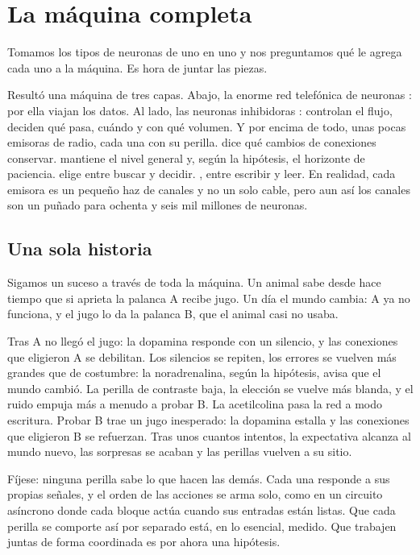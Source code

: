 \chapter{La máquina completa}


Tomamos los tipos de neuronas de uno en uno y nos preguntamos qué le agrega cada uno a la máquina. Es hora de juntar las piezas.

Resultó una máquina de tres capas. Abajo, la enorme red telefónica de neuronas : por ella viajan los datos. Al lado, las neuronas inhibidoras : controlan el flujo, deciden qué pasa, cuándo y con qué volumen. Y por encima de todo, unas pocas emisoras de radio, cada una con su perilla.  dice qué cambios de conexiones conservar.  mantiene el nivel general y, según la hipótesis, el horizonte de paciencia.  elige entre buscar y decidir. , entre escribir y leer. En realidad, cada emisora es un pequeño haz de canales y no un solo cable, pero aun así los canales son un puñado para ochenta y seis mil millones de neuronas.

\section*{Una sola historia}

Sigamos un suceso a través de toda la máquina. Un animal sabe desde hace tiempo que si aprieta la palanca A recibe jugo. Un día el mundo cambia: A ya no funciona, y el jugo lo da la palanca B, que el animal casi no usaba.

Tras A no llegó el jugo: la dopamina responde con un silencio, y las conexiones que eligieron A se debilitan. Los silencios se repiten, los errores se vuelven más grandes que de costumbre: la noradrenalina, según la hipótesis, avisa que el mundo cambió. La perilla de contraste baja, la elección se vuelve más blanda, y el ruido empuja más a menudo a probar B. La acetilcolina pasa la red a modo escritura. Probar B trae un jugo inesperado: la dopamina estalla y las conexiones que eligieron B se refuerzan. Tras unos cuantos intentos, la expectativa alcanza al mundo nuevo, las sorpresas se acaban y las perillas vuelven a su sitio.

Fíjese: ninguna perilla sabe lo que hacen las demás. Cada una responde a sus propias señales, y el orden de las acciones se arma solo, como en un circuito asíncrono donde cada bloque actúa cuando sus entradas están listas. Que cada perilla se comporte así por separado está, en lo esencial, medido. Que trabajen juntas de forma coordinada es por ahora una hipótesis.

